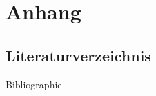 \section{Anhang}
\label{sec:appendix}

\label{sec:bibliography}
\subsection{Literaturverzeichnis}
\begin{frame}[allowframebreaks]{Bibliographie}
    \printbibliography
\end{frame}

